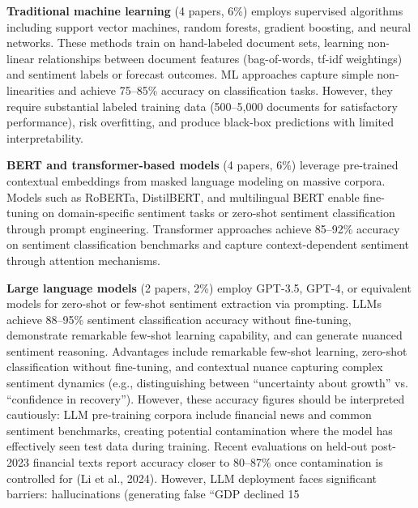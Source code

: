 \documentclass[11pt,twocolumn]{article}
\begin{document}
\textbf{Traditional machine learning} (4 papers, 6\%) employs supervised algorithms including support vector machines, random forests, gradient boosting, and neural networks. These methods train on hand-labeled document sets, learning non-linear relationships between document features (bag-of-words, tf-idf weightings) and sentiment labels or forecast outcomes. ML approaches capture simple non-linearities and achieve 75--85\% accuracy on classification tasks. However, they require substantial labeled training data (500--5,000 documents for satisfactory performance), risk overfitting, and produce black-box predictions with limited interpretability.

\textbf{BERT and transformer-based models} (4 papers, 6\%) leverage pre-trained contextual embeddings from masked language modeling on massive corpora. Models such as RoBERTa, DistilBERT, and multilingual BERT enable fine-tuning on domain-specific sentiment tasks or zero-shot sentiment classification through prompt engineering. Transformer approaches achieve 85--92\% accuracy on sentiment classification benchmarks and capture context-dependent sentiment through attention mechanisms.

\textbf{Large language models} (2 papers, 2\%) employ GPT-3.5, GPT-4, or equivalent models for zero-shot or few-shot sentiment extraction via prompting. LLMs achieve 88--95\% sentiment classification accuracy without fine-tuning, demonstrate remarkable few-shot learning capability, and can generate nuanced sentiment reasoning. Advantages include remarkable few-shot learning, zero-shot classification without fine-tuning, and contextual nuance capturing complex sentiment dynamics (e.g., distinguishing between ``uncertainty about growth'' vs. ``confidence in recovery''). However, these accuracy figures should be interpreted cautiously: LLM pre-training corpora include financial news and common sentiment benchmarks, creating potential contamination where the model has effectively seen test data during training. Recent evaluations on held-out post-2023 financial texts report accuracy closer to 80--87\% once contamination is controlled for (Li et al., 2024). However, LLM deployment faces significant barriers: hallucinations (generating false ``GDP declined 15%
\end{document}
